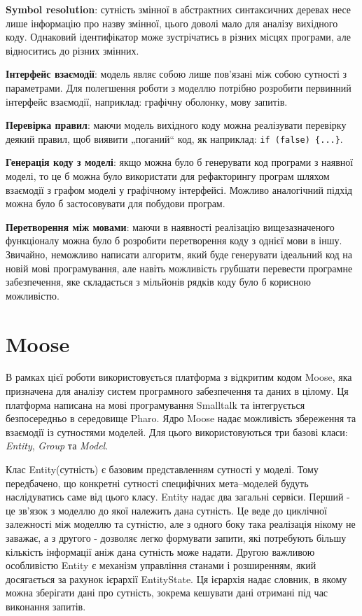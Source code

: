 \documentclass[12pt,a4paper]{article}
\begin{document}
\textbf{Symbol resolution}: сутність змінної в абстрактних синтаксичних деревах несе лише інформацію про назву змінної, цього доволі мало для аналізу вихідного коду. Однаковий ідентифікатор може зустрічатись в різних місцях програми, але відноситись до різних змінних.

\textbf{Інтерфейс взаємодії}: модель являє собою лише пов'язані між собою сутності з параметрами. Для полегшення роботи з моделлю потрібно розробити первинний інтерфейс взаємодії, наприклад: графічну оболонку, мову запитів.

\textbf{Перевірка правил}: маючи модель вихідного коду можна реалізувати перевірку деякий правил, щоб виявити „поганий“ код, як наприклад: \lstinline$if (false) {...}$.

\textbf{Генерація коду з моделі}: якщо можна було б генерувати код програми з наявної моделі, то це б можна було використати для рефакторингу програм шляхом взаємодії з графом моделі у графічному інтерфейсі. Можливо аналогічний підхід можна було б застосовувати для побудови програм.

\textbf{Перетворення між мовами}: маючи в наявності реалізацію вищезазначеного функціоналу можна було б розробити перетворення коду з однієї мови в іншу. Звичайно, неможливо написати алгоритм, який буде генерувати ідеальний код на новій мові програмування, але навіть можливість грубшати перевести програмне забезпечення, яке складається з мільйонів рядків коду було б корисною можливістю.

\clearpage

\section{Moose}

В рамках цієї роботи використовується платформа з відкритим кодом Moose\cite{moose}, яка призначена для аналізу систем програмного забезпечення та даних в цілому. Ця платформа написана на мові програмування Smalltalk та інтегрується безпосередньо в середовище Pharo. Ядро Moose надає можливість збереження та взаємодії із сутностями моделей. Для цього використовуються три базові класи: \emph{Entity}, \emph{Group} та \emph{Model}.

Клас Entity(сутність) є базовим представленням сутності у моделі. Тому передбачено, що конкретні сутності специфічних мета--моделей будуть наслідуватись саме від цього класу. Entity надає два загальні сервіси. Перший - це зв'язок з моделлю до якої належить дана сутність. Це веде до циклічної залежності між моделлю та сутністю, але з одного боку така реалізація нікому не заважає, а з другого - дозволяє легко формувати запити, які потребують більшу кількість інформації аніж дана сутність може надати. Другою важливою особливістю Entity є механізм управління станами і розширенням, який досягається за рахунок ієрархії EntityState. Ця ієрархія надає словник, в якому можна зберігати дані про сутність, зокрема кешувати дані отримані під час виконання запитів.
\end{document}

